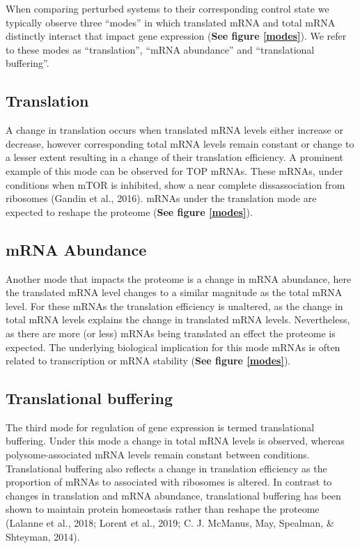 \documentclass[12pt,openany]{book}
\begin{document}
When comparing perturbed systems to their corresponding control state we
typically observe three ``modes'' in which translated mRNA and total
mRNA distinctly interact that impact gene expression (\textbf{See figure
\ref{modes}}). We refer to these modes as ``translation'', ``mRNA
abundance'' and ``translational buffering''.

\subsection{Translation}

A change in translation occurs when translated mRNA levels either
increase or decrease, however corresponding total mRNA levels remain
constant or change to a lesser extent resulting in a change of their
translation efficiency. A prominent example of this mode can be observed
for TOP mRNAs. These mRNAs, under conditions when mTOR is inhibited,
show a near complete dissassociation from ribosomes (Gandin et al.,
2016). mRNAs under the translation mode are expected to reshape the
proteome (\textbf{See figure \ref{modes}}).

\subsection{mRNA Abundance}

Another mode that impacts the proteome is a change in mRNA abundance,
here the translated mRNA level changes to a similar magnitude as the
total mRNA level. For these mRNAs the translation efficiency is
unaltered, as the change in total mRNA levels explains the change in
translated mRNA levels. Nevertheless, as there are more (or less) mRNAs
being translated an effect the proteome is expected. The underlying
biological implication for this mode mRNAs is often related to
transcription or mRNA stability (\textbf{See figure \ref{modes}}).

\subsection{Translational buffering} \label{modeBuffering}

The third mode for regulation of gene expression is termed translational
buffering. Under this mode a change in total mRNA levels is observed,
whereas polysome-associated mRNA levels remain constant between
conditions. Translational buffering also reflects a change in
translation efficiency as the proportion of mRNAs to associated with
ribosomes is altered. In contrast to changes in translation and mRNA
abundance, translational buffering has been shown to maintain protein
homeostasis rather than reshape the proteome (Lalanne et al., 2018;
Lorent et al., 2019; C. J. McManus, May, Spealman, \& Shteyman, 2014).
\end{document}
